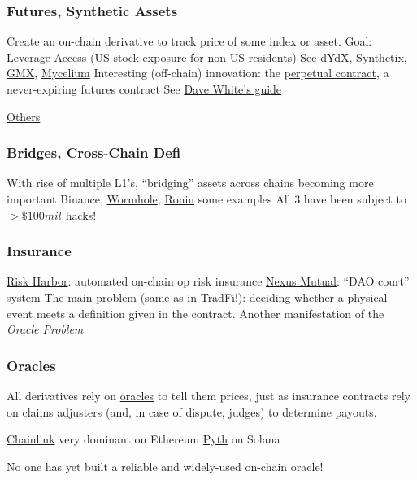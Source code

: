 \documentclass[]{beamer}
\begin{document}
\begin{frame}
\frametitle{Futures, Synthetic Assets}

\bi
\m Create an on-chain derivative to track price of some index or asset. Goal:
\bi
\m Leverage
\m Access (US stock exposure for non-US residents)
\ei
\m See \href{https://dydx.exchange/}{dYdX}, \href{https://synthetix.io/}{Synthetix}, \href{https://gmx.io/}{GMX}, \href{https://twitter.com/mycelium_xyz}{Mycelium}
\m Interesting (off-chain) innovation: the \href{https://www.bitmex.com/app/perpetualContractsGuide}{perpetual contract}, a never-expiring futures contract
\bi
\m See \href{https://www.paradigm.xyz/2021/03/the-cartoon-guide-to-perps}{Dave White's guide}
\ei
\ei

\vspace{2ex}
\href{https://twitter.com/AnthonyLeeZhang/status/1579177065886404608}{Others}

\end{frame}






\begin{frame}
\frametitle{Bridges, Cross-Chain Defi}

\bi
\m With rise of multiple L1's, ``bridging'' assets across chains becoming more important
\m Binance, \href{https://solana.com/wormhole}{Wormhole}, \href{https://cointelegraph.com/news/the-aftermath-of-axie-infinity-s-650m-ronin-bridge-hack}{Ronin} some examples
\m All 3 have been subject to $>\$100mil$ hacks!
\ei

\end{frame}

\begin{frame}
\frametitle{Insurance}

\bi
\m \href{https://www.riskharbor.com/}{Risk Harbor}: automated on-chain op risk insurance
\m \href{https://nexusmutual.io/}{Nexus Mutual}: ``DAO court'' system
\ei
The main problem (same as in TradFi!): deciding whether a physical event meets a definition given in the contract. 
\bi
\m Another manifestation of the \emph{Oracle Problem}
\ei 

\end{frame}

\begin{frame}
\frametitle{Oracles}

All derivatives rely on \ul{oracles} to tell them prices, just as insurance contracts rely on claims adjusters (and, in case of dispute, judges) to determine payouts. 

\bi
\m \href{https://chain.link/}{Chainlink} very dominant on Ethereum
\m \href{https://pyth.network/}{Pyth} on Solana
\ei

No one has yet built a reliable and widely-used on-chain oracle! 

\end{frame}
\end{document}

